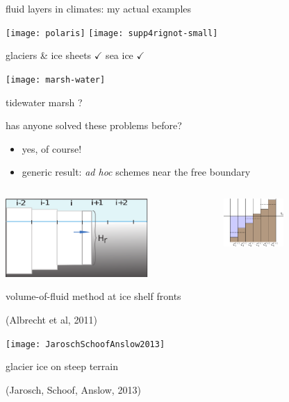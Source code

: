 \documentclass[xcolor={dvipsnames}]{beamer}
\begin{document}
\begin{frame}{fluid layers in climates: my actual examples}

\texttt{[image: polaris]}
\hfill
\texttt{[image: supp4rignot-small]}

\small glaciers \& ice sheets $\checkmark$ \hfill sea ice $\checkmark$

\medskip
\begin{center}
\texttt{[image: marsh-water]}

\small tidewater marsh ?
\end{center}
\end{frame}


\begin{frame}{has anyone solved these problems before?}

\vspace{-2mm}

  \begin{itemize}
  \item yes, of course!
  \item generic result: \emph{ad hoc} schemes near the free boundary
  \end{itemize}

\medskip
\begin{columns}
\begin{column}{0.45\textwidth}
\includegraphics[width=0.7\textwidth,keepaspectratio=true]{Albrechtetal2011half}

\scriptsize volume-of-fluid method at ice shelf fronts

\tiny (Albrecht et al, 2011)

\medskip
\texttt{[image: JaroschSchoofAnslow2013]}

\scriptsize glacier ice on steep terrain

\smallskip
\tiny (Jarosch, Schoof, Anslow, 2013)
\end{column}

\begin{column}{0.5\textwidth}
\hfill \includegraphics[width=0.45\textwidth,keepaspectratio=true]{LeVequeGeorgeBerger2011}


\end{column}
\end{columns}
\end{frame}
\end{document}

